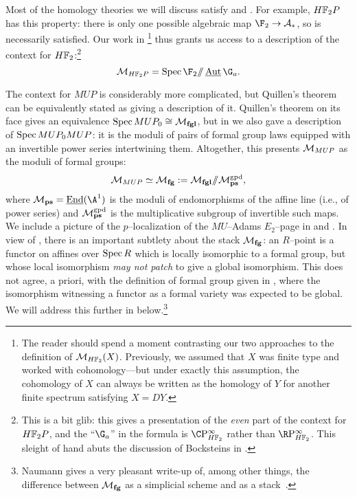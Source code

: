 \begin{example}
Most of the homology theories we will discuss satisfy {\CH} and {\FH}.  For example, \(\HFtwo P\) has this property: there is only one possible algebraic map \(\F_2 \to \mathcal A_*\), so {\FH} is necessarily satisfied.  Our work in \footnote{The reader should spend a moment contrasting our two approaches to the definition of \(\context{\HFtwo}(X)\).  Previously, we assumed that \(X\) was finite type and worked with cohomology---but under exactly this assumption, the cohomology of \(X\) can always be written as the homology of \(Y\) for another finite spectrum satisfying \(X = DY\).} thus grants us access to a description of the context for \(\HFtwo\):\footnote{This is a bit glib: this gives a presentation of the \emph{even} part of the context for \(\HFtwo P\), and the ``\(\G_a\)'' in the formula is \(\CP^\infty_{\HFtwo}\) rather than \(\RP^\infty_{\HFtwo}\).  This sleight of hand abuts the discussion of Bocksteins in .} \[\context{\HFtwo P} = \Spec \F_2 \mmod \InternalAut{\G_a}.\]
\end{example}

\begin{example}\label{ContextOfMUPExample}
The context for \(MUP\) is considerably more complicated, but Quillen's theorem can be equivalently stated as giving a description of it.  Quillen's theorem on its face gives an equivalence \(\operatorname{Spec} MUP_0 \cong \mathcal{M}_{\mathbf{fgl}}\), but in  we also gave a description of \(\operatorname{Spec} MUP_0 MUP\): it is the moduli of pairs of formal group laws equipped with an invertible power series intertwining them.  Altogether, this presents \(\mathcal{M}_{MUP}\) as the moduli of formal groups: \[\mathcal{M}_{MUP} \simeq \mathcal{M}_{\mathbf{fg}} := \mathcal{M}_{\mathbf{fgl}} /\!\!/ \mathcal{M}_{\mathbf{ps}}^{\mathrm{gpd}},\] where \(\moduli{ps} = \InternalEnd(\A^1)\) is the moduli of endomorphisms of the affine line (i.e., of power series) and \(\mathcal{M}_{\mathbf{ps}}^{\mathrm{gpd}}\) is the multiplicative subgroup of invertible such maps.  We include a picture of the \(p\)--localization of the \(MU\)--Adams \(E_2\)--page in  and .  In view of , there is an important subtlety about the stack \(\mathcal{M}_{\mathbf{fg}}\): an \(R\)--point is a functor on affines over \(\operatorname{Spec} R\) which is locally isomorphic to a formal group, but whose local isomorphism \emph{may not patch} to give a global isomorphism.  This does not agree, a priori, with the definition of formal group given in , where the isomorphism witnessing a functor as a formal variety was expected to be global.  We will address this further in  below.\footnote{Naumann gives a very pleasant write-up of, among other things, the difference between $\mathcal{M}_{\mathbf{fg}}$ as a simplicial scheme and as a stack~\cite{Naumann}.}
\end{example}


